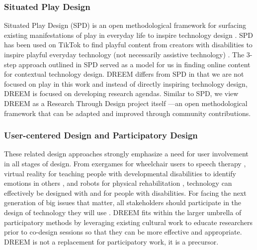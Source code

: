 \subsubsection{Situated Play Design}
Situated Play Design (SPD) is an open methodological framework for surfacing existing manifestations of play in everyday life to inspire technology design \cite{altarribabertranChasingPlayPotentials2019a,altarribabertranDesigningPlayThat2019}. SPD has been used on TikTok to find playful content from creators with disabilities to inspire playful everyday technology (not necessarily assistive technology) \cite{duvalChasingPlayTikTok2021}. The 3-step approach outlined in SPD served as a model for us in finding online content for contextual technology design. DREEM differs from SPD in that we are not focused on play in this work and instead of directly inspiring technology design, DREEM is focused on developing research agendas. Similar to SPD, we view DREEM as a Research Through Design project itself \cite{gaverWhatShouldWe2012,zimmermanResearchDesignMethod2007}—an open methodological framework that can be adapted and improved through community contributions. 

\subsubsection{User-centered Design and Participatory Design} \label{PD}
These related design approaches strongly emphasize a need for user involvement in all stages of design.
From exergames for wheelchair users \cite{gerlingDesigningMovementbasedPlay2016} to speech therapy \cite{duvalSpokeItCoCreatedSpeech2018}, virtual reality for teaching people with developmental disabilities to identify emotions in others  \cite{thangPhDForumStrengthening2018}, and robots for physical rehabilitation \cite{marquezseguraPlayificationPhySeEarCase2016}, technology can effectively be designed with and for people with disabilities. For facing the next generation of big issues that matter, all stakeholders should participate in the design of technology they will use \cite{bodkerParticipatoryDesignThat2018}. DREEM fits within the larger umbrella of participatory methods by leveraging existing cultural work to educate researchers prior to co-design sessions so that they can be more effective and appropriate. DREEM is not a replacement for participatory work, it is a precursor.

